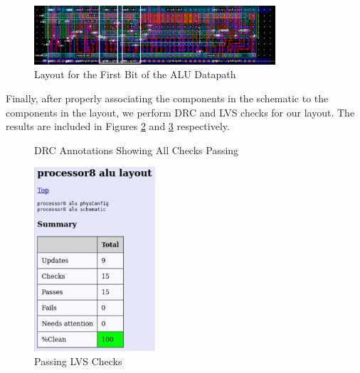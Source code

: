 \documentclass{article}
\begin{document}
	
	\begin{figure}[H]
		\centerline{\includegraphics[width=0.8\textwidth]{alu_layout_bit0.png}}
		\caption{Layout for the First Bit of the ALU Datapath}
		\label{fig::alu_layout_bit0}
	\end{figure}
	
	\noindent Finally, after properly associating the components in the schematic to the components in the layout, we perform DRC and LVS checks for our layout. The results are included in Figures \ref{fig::alu_drc} and \ref{fig::alu_lvs} respectively.
	
	\begin{figure}[H]
		\centerline{}
		\caption{DRC Annotations Showing All Checks Passing}
		\label{fig::alu_drc}
	\end{figure}
	
	\begin{figure}[H]
		\centerline{\includegraphics[width=0.4\textwidth]{alu_lvs.png}}
		\caption{Passing LVS Checks}
		\label{fig::alu_lvs}
	\end{figure}
	
\end{document}
